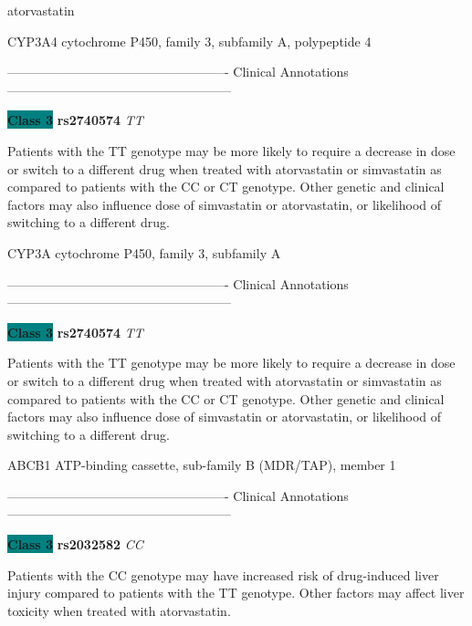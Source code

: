 \documentclass{resume} %
\begin{document}
\begin{rSection}{ atorvastatin }
\begin{rSubsection}{ CYP3A4 }{ cytochrome P450, family 3, subfamily A, polypeptide 4 }{}{}
\item[] ---------------------------------------------------- Clinical Annotations -----------------------------------------------------\newline
\item \textbf{\colorbox{teal} {Class 3}} \textbf{ rs2740574 } \textit{ TT }
\item[] Patients with the TT genotype may be more likely to require a decrease in dose or switch to a different drug when treated with atorvastatin or simvastatin as compared to patients with the CC or CT genotype. Other genetic and clinical factors may also influence dose of simvastatin or atorvastatin, or likelihood of switching to a different drug.
\end{rSubsection}\begin{rSubsection}{ CYP3A }{ cytochrome P450, family 3, subfamily A }{}{}
\item[]

\item[] ---------------------------------------------------- Clinical Annotations -----------------------------------------------------\newline
\item \textbf{\colorbox{teal} {Class 3}} \textbf{ rs2740574 } \textit{ TT }
\item[] Patients with the TT genotype may be more likely to require a decrease in dose or switch to a different drug when treated with atorvastatin or simvastatin as compared to patients with the CC or CT genotype. Other genetic and clinical factors may also influence dose of simvastatin or atorvastatin, or likelihood of switching to a different drug.
\end{rSubsection}\begin{rSubsection}{ ABCB1 }{ ATP-binding cassette, sub-family B (MDR/TAP), member 1 }{}{}
\item[]

\item[] ---------------------------------------------------- Clinical Annotations -----------------------------------------------------\newline
\item \textbf{\colorbox{teal} {Class 3}} \textbf{ rs2032582 } \textit{ CC }
\item[] Patients with the CC genotype may have increased risk of drug-induced liver injury compared to patients with the TT genotype. Other factors may affect liver toxicity when treated with atorvastatin.
\end{rSubsection}


\end{rSection}
\end{document}
